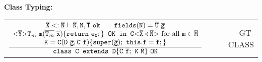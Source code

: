 {\begin{minipage}{\textwidth}
\begin{small}
\begin{tabularx}{\textwidth}{c X r}
\end{tabularx}\\[1em]
\textbf{Class Typing:}\\[1em]
  \begin{tabularx}{\textwidth}{c X r}
  $\frac{\displaystyle 
    \begin{array}{c}
      \mathtt{\overline{\tt X} <: \overline{\tt N} \vdash \overline{\tt N}, N, \overline{\tt T}\ \texttt{ok}
      \quad\quad fields(\mathtt{N}) = \overline{\tt \mathtt{U}} \ \overline{\tt \mathtt{g}}}\\
      \mathtt{\mathtt{ {\tt <} \overline{\tt Y} {\tt >} } T_\mathit{m}\ \texttt{m}(\overline{\tt T_\mathit{m}}\ \overline{\tt \mathtt{x}}) \{\texttt{return}\ \mathtt{e}_0;\}
  \texttt{ OK in }\mathtt{C {\tt <} \overline{\tt X} \triangleleft \overline{\tt N} {\tt >} }  \textrm{ for all } m
      \in \overline{\tt \mathtt{M}}}\\
      \mathtt{K = C(\overline{D} \ \overline{g}, \overline{C} \ \overline{f}) \{ \texttt{super}(\overline{g}); \ \texttt{this}.\overline{f}=\overline{f}; \} }\\
  \end{array}
    }{\displaystyle \mathtt{\texttt{class C extends D}\{ \overline{C} \ \overline{f}; \ K \ \overline{M} \} \ \texttt{OK}}}
  $ & & GT-CLASS
\end{tabularx}
\end{small}
\end{minipage}
}


